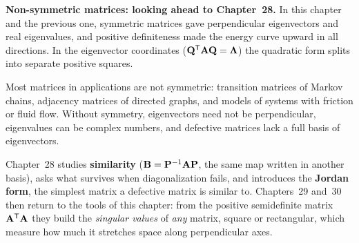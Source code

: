 \begin{connectionbox}
\textbf{Non-symmetric matrices: looking ahead to Chapter~28.}
In this chapter and the previous one, symmetric matrices gave perpendicular eigenvectors and real
eigenvalues, and positive definiteness made the energy curve upward in all directions. In the
eigenvector coordinates ($\mathbf{Q}^{\mathsf{T}}\mathbf{A}\mathbf{Q} = \mathbf{\Lambda}$) the quadratic form splits into
separate positive squares.

Most matrices in applications are not symmetric: transition matrices of Markov chains, adjacency
matrices of directed graphs, and models of systems with friction or fluid flow. Without symmetry,
eigenvectors need not be perpendicular, eigenvalues can be complex numbers, and defective matrices
lack a full basis of eigenvectors.

Chapter~28 studies \textbf{similarity} ($\mathbf{B} = \mathbf{P}^{-1}\mathbf{A}\mathbf{P}$, the same map written in
another basis), asks what survives when diagonalization fails, and introduces the \textbf{Jordan
form}, the simplest matrix a defective matrix is similar to. Chapters~29 and~30 then return to the
tools of this chapter: from the positive semidefinite matrix $\mathbf{A}^{\mathsf{T}}\mathbf{A}$ they build the
\emph{singular values} of \emph{any} matrix, square or rectangular, which measure how much it
stretches space along perpendicular axes.
\end{connectionbox}

